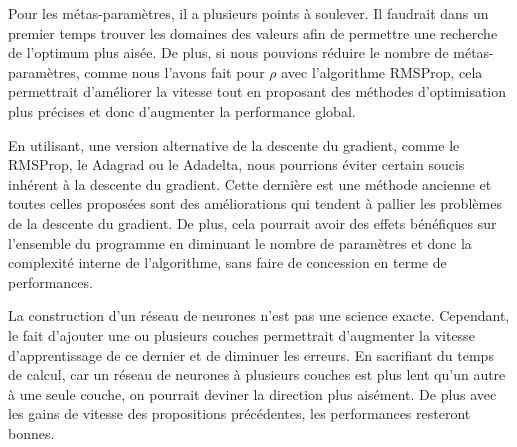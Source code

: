 \documentclass[a4paper, 11pt]{article}
\begin{document}
Pour les métas-paramètres, il a plusieurs points à soulever. Il faudrait dans un premier temps trouver les domaines des valeurs afin de permettre
une recherche de l'optimum plus aisée. De plus, si nous pouvions réduire le nombre de métas-paramètres, comme nous l'avons fait pour $\rho$ avec l'algorithme
RMSProp, cela permettrait d'améliorer la vitesse tout en proposant des méthodes d'optimisation plus précises et donc d'augmenter la performance global.

En utilisant, une version alternative de la descente du gradient, comme le RMSProp, le Adagrad ou le Adadelta, nous pourrions éviter certain soucis
inhérent à la descente du gradient. Cette dernière est une méthode ancienne et toutes celles proposées sont des améliorations qui tendent à pallier les
problèmes de la descente du gradient. De plus, cela pourrait avoir des effets bénéfiques sur l'ensemble du programme en diminuant le nombre de paramètres
et donc la complexité interne de l'algorithme, sans faire de concession en terme de performances.

La construction d'un réseau de neurones n'est pas une science exacte. Cependant, le fait d'ajouter une ou plusieurs couches permettrait d'augmenter la 
vitesse d'apprentissage de ce dernier et de diminuer les erreurs. En sacrifiant du temps de calcul, car un réseau de neurones à plusieurs couches est plus
lent qu'un autre à une seule couche, on pourrait deviner la direction plus aisément. De plus avec les gains de vitesse des propositions précédentes, les
performances resteront bonnes.

\newpage

\nocite{*}

\end{document}
